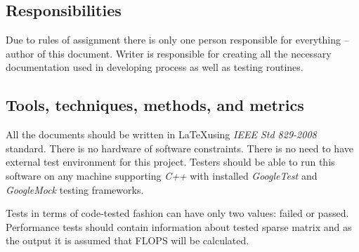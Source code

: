 \subsection{Responsibilities} \label{s:introduction:resposibilities}
	\begin{comment}
		$<$Provide an overview of the organizational content topic(s) and responsibilities for testing tasks. Identify organizational components and their primary (they are the task leader) and secondary (they are not the leader, but providing support) test-related responsibilities. $>$
	\end{comment}
	Due to rules of assignment there is only one person responsible for everything -- author of this document. Writer is responsible for creating all the necessary documentation used in developing process as well as testing routines.
\subsection{Tools, techniques, methods, and metrics} \label{s:introduction:tools-techniques-methods-and-metrics}
	\begin{comment}
		$<$Describe documents, hardware and software, test tools, techniques, methods, and test environment to be used in the test process. Describe the techniques that will be used to identify and capture reusable testware. Include information regarding acquisition, training, support, and qualification for each tool, technology, and method.\\
		Document the metrics to be used by the test effort, and describe how these metrics support the test objectives. Metrics appropriate to the Level Test Plans (e.g., component, component integration, system, and acceptance) may be included in those documents (see Annex E). $>$
	\end{comment}
	All the documents should be written in \LaTeX using \emph{IEEE Std 829-2008} standard. There is no hardware of software constraints. There is no need to have external test environment for this project. Testers should be able to run this software on any machine supporting \emph{C++} with installed \emph{GoogleTest} and \emph{GoogleMock} testing frameworks.
	
	Tests in terms of code-tested fashion can have only two values: failed or passed. Performance tests should contain information about tested sparse matrix and as the output it is assumed that \gls{FLOPS} will be calculated.